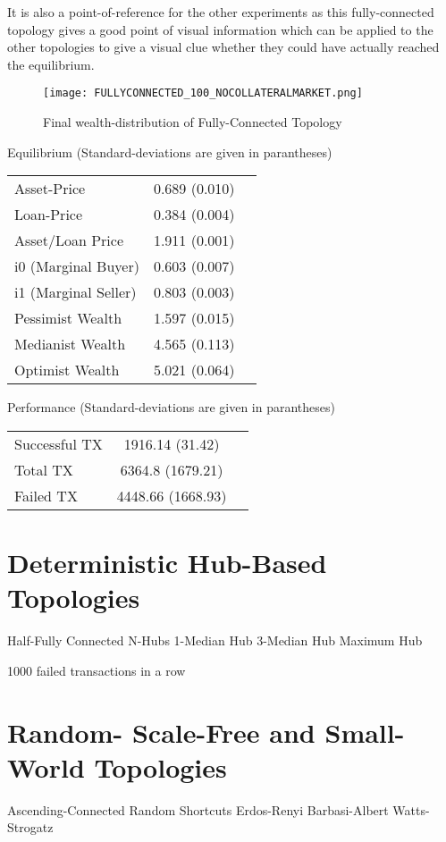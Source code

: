 \documentclass[Bachelorarbeit.tex]{subfiles}
\begin{document}
It is also a point-of-reference for the other experiments as this fully-connected topology gives a good point of visual information which can be applied to the other topologies to give a visual clue whether they could have actually reached the equilibrium.

\begin{figure}[ht]
	\centering
  \texttt{[image: FULLYCONNECTED\_100\_NOCOLLATERALMARKET.png]}
	\caption{Final wealth-distribution of Fully-Connected Topology}
	\label{fig1}
\end{figure}


Equilibrium (Standard-deviations are given in parantheses)

\begin{tabular} { l c r }
	Asset-Price & 0.689 (0.010) \\
	Loan-Price & 0.384 (0.004) \\
	Asset/Loan Price & 1.911 (0.001) \\
	i0 (Marginal Buyer) & 0.603 (0.007) \\
	i1 (Marginal Seller) & 0.803 (0.003) \\
	Pessimist Wealth & 1.597 (0.015) \\
	Medianist Wealth & 4.565 (0.113) \\
	Optimist Wealth & 5.021 (0.064) \\
\end{tabular}

Performance (Standard-deviations are given in parantheses)

\begin{tabular} { l c r }
	Successful TX & 1916.14 (31.42) \\
	Total TX & 6364.8 (1679.21) \\
	Failed TX & 4448.66 (1668.93) \\
\end{tabular}

\section{Deterministic Hub-Based Topologies} 

Half-Fully Connected
N-Hubs
1-Median Hub
3-Median Hub
Maximum Hub

1000 failed transactions in a row

\section{Random- Scale-Free and Small-World Topologies}
Ascending-Connected Random Shortcuts
Erdos-Renyi
Barbasi-Albert
Watts-Strogatz
\end{document}

